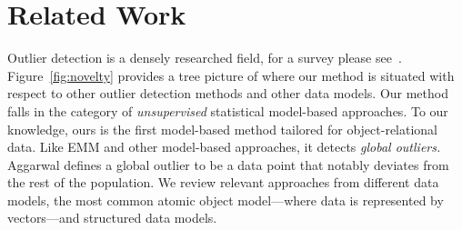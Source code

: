 {				\section{Related Work}
				Outlier detection is a densely researched field, for a survey please see~\cite{aggarwal2013,Akoglu2015}.
				Figure~\ref{fig:novelty} provides a tree picture of where our method is situated with respect to other outlier detection methods and other data models. 
				Our method falls in the category of {\em unsupervised} statistical model-based approaches. To our knowledge, ours is the first model-based method tailored for object-relational data. Like EMM and other model-based approaches, it detects {\em global outliers.} Aggarwal \cite{aggarwal2013} defines a global outlier to be a data point that notably deviates from the rest of the population. We review relevant approaches from different data models, the most common atomic object model---where data is represented by vectors---and structured data models.\\
				
}
